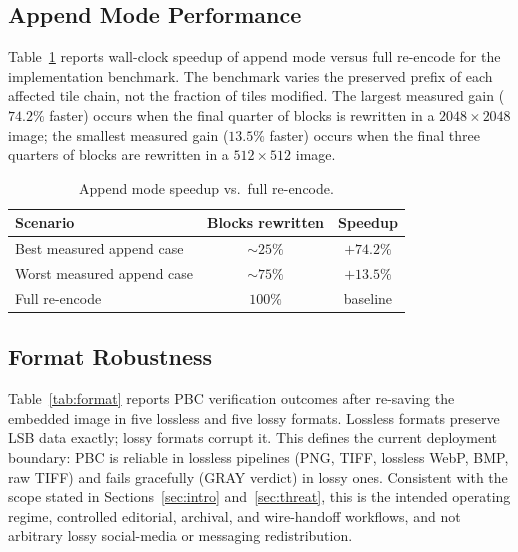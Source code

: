 \documentclass[conference]{IEEEtran}
\begin{document}
\subsection{Append Mode Performance}

Table~\ref{tab:append} reports wall-clock speedup of append mode versus
full re-encode for the implementation benchmark. The benchmark varies
the preserved prefix of each affected tile chain, not the fraction of
tiles modified. The largest measured gain ($74.2\%$ faster) occurs when
the final quarter of blocks is rewritten in a $2048{\times}2048$ image;
the smallest measured gain ($13.5\%$ faster) occurs when the final
three quarters of blocks are rewritten in a $512{\times}512$ image.

\begin{table}[t]
  \centering
  \caption{Append mode speedup vs.\ full re-encode.}
  \label{tab:append}
  \begin{tabular}{lcc}
    \toprule
    Scenario & Blocks rewritten & Speedup \\
    \midrule
    Best measured append case & ${\sim}25\%$ & $+74.2\%$ \\
    Worst measured append case & ${\sim}75\%$ & $+13.5\%$ \\
    Full re-encode & $100\%$     & baseline \\
    \bottomrule
  \end{tabular}
\end{table}

\subsection{Format Robustness}

Table~\ref{tab:format} reports PBC verification outcomes after
re-saving the embedded image in five lossless and five lossy formats.
Lossless formats preserve LSB data exactly; lossy formats corrupt it.
This defines the current deployment boundary: PBC is reliable in
lossless pipelines (PNG, TIFF, lossless WebP, BMP, raw TIFF)
and fails gracefully (GRAY verdict) in lossy ones. Consistent with the scope stated in Sections~\ref{sec:intro} and~\ref{sec:threat}, this is the intended operating regime, controlled editorial, archival, and wire-handoff workflows, and not arbitrary lossy social-media or messaging redistribution.
\end{document}
